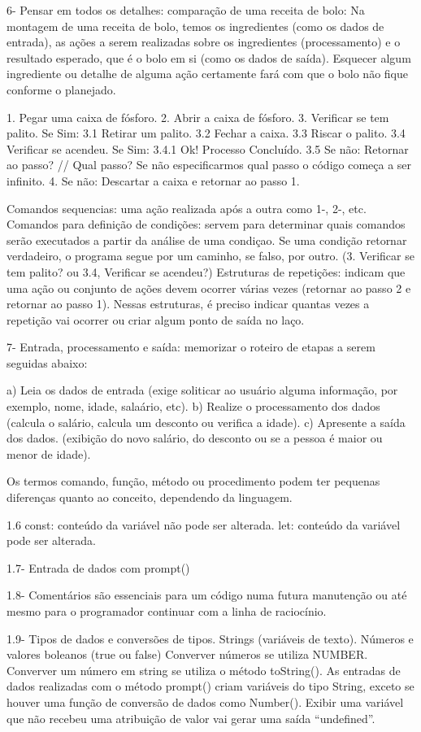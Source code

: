 6- Pensar em todos os detalhes: comparação de uma receita de bolo:
Na montagem de uma receita de bolo, temos os ingredientes (como os dados de entrada), as ações a serem realizadas sobre os
ingredientes (processamento) e o resultado esperado, que é o bolo em si (como os dados de saída). Esquecer algum ingrediente
ou detalhe de alguma ação certamente fará com que o bolo não fique conforme o planejado.

1. Pegar uma caixa de fósforo.
2. Abrir a caixa de fósforo.
3. Verificar se tem palito. Se Sim:
3.1 Retirar um palito.
3.2 Fechar a caixa.
3.3 Riscar o palito.
3.4 Verificar se acendeu. Se Sim:
3.4.1 Ok! Processo Concluído.
3.5 Se não: Retornar ao passo? // Qual passo? Se não especificarmos qual passo o código começa a ser infinito.
4. Se não: Descartar a caixa e retornar ao passo 1.

Comandos sequencias: uma ação realizada após a outra como 1-, 2-, etc.
Comandos para definição de condições: servem para determinar quais comandos serão executados a partir da análise de uma condiçao.
Se  uma condição retornar verdadeiro, o programa segue por um caminho, se falso, por outro. (3. Verificar se tem palito? ou 3.4, Verificar se
acendeu?)
Estruturas de repetições: indicam que uma ação ou conjunto de ações devem ocorrer várias vezes  (retornar ao passo 2 e retornar ao passo
1). Nessas estruturas, é preciso indicar quantas vezes a repetição vai ocorrer ou criar algum ponto de saída no laço.

7- Entrada, processamento e saída: memorizar o roteiro de etapas a serem seguidas abaixo:

a) Leia os dados de entrada (exige soliticar ao usuário alguma informação, por exemplo, nome, idade, salaário, etc).
b) Realize o processamento dos dados (calcula o salário, calcula um desconto ou verifica a idade).
c) Apresente a saída dos dados. (exibição do novo salário, do desconto ou se a pessoa é maior ou menor de idade).

Os termos comando, função, método ou
procedimento podem ter pequenas diferenças quanto ao conceito, dependendo da linguagem.

1.6
const: conteúdo da variável não pode ser alterada.
let: conteúdo da variável pode ser alterada.

1.7- Entrada de dados com prompt()

1.8- Comentários são essenciais para um código numa futura manutenção
ou até mesmo para o programador continuar com a linha de raciocínio.

1.9- Tipos de dados e conversões de tipos.
Strings (variáveis de texto).
Números e valores boleanos (true ou false)
Converver números se utiliza NUMBER.
Converver um número em string se utiliza o método toString().
As entradas de dados realizadas com o método prompt()
criam variáveis do tipo String, exceto se houver uma função de conversão de
dados como Number(). Exibir uma variável que não recebeu uma atribuição
de valor vai gerar uma saída “undefined”.

